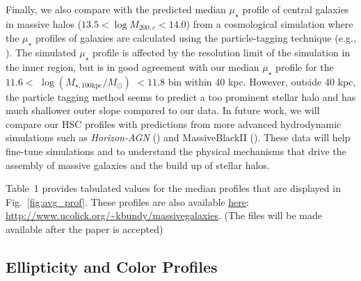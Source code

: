 \documentclass[a4paper,fleqn,usenatbib]{mnras}
\def\logmtot{{$\log (M_{\star,100\mathrm{kpc}}/M_{\odot})$}}
\def\mden{{$\mu_{\star}$}}
\begin{document}
    Finally, we also compare with the predicted median \mden{} profile of central 
    galaxies in massive halos ($13.5 < \log M_{200,c} < 14.0$) from a cosmological 
    simulation where the \mden{} profiles of galaxies are calculated using the 
    particle-tagging technique (e.g., \citealt{Cooper2010}). 
    The simulated \mden{} profile is affected by the resolution limit of the simulation 
    in the inner region, but is in good agreement with our median \mden{} profile for 
    the $11.6 <$ \logmtot{} $< 11.8$ bin within 40 kpc. 
    However, outside 40 kpc, the particle tagging method seems to predict a too 
    prominent stellar halo and has much shallower outer slope compared to our data. 
    In future work, we will compare our HSC profiles with predictions from more 
    advanced hydrodynamic simulations such as \textit{Horizon-AGN} (\citealt{Dubois2014}) 
    and MassiveBlackII (\citealt{Khandai2015}). 
    These data will help fine-tune simulations and to understand the physical mechanisms 
    that drive the assembly of massive galaxies and the build up of stellar halos.

    Table~1 provides tabulated values for the median profiles that are 
    displayed in Fig.~\ref{fig:avg_prof}. 
    These profiles are also available  
    \href{http://www.ucolick.org/\~kbundy/massivegalaxies}{here}:
    {\url{http://www.ucolick.org/\~kbundy/massivegalaxies}}. (The files will be made 
    available after the paper is accepted)
    

\subsection{Ellipticity and Color Profiles}
    \label{ssec:ell_color}
    
\end{document}
